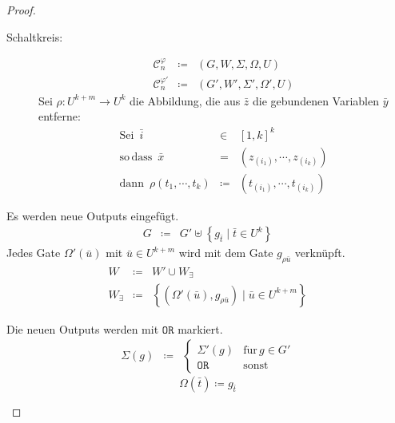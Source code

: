 \begin{proof}
\begin{casenv}
\begin{description}
\item [{Schaltkreis:}] 
\begin{eqnarray*}
\mathcal{C}_{n}^{\varphi} & \coloneqq & \left(G,W,\Sigma,\Omega,U\right)\\
\mathcal{C}_{n}^{\varphi'} & \coloneqq & \left(G',W',\Sigma',\Omega',U\right)
\end{eqnarray*}
Sei $\rho:U^{k+m}\rightarrow U^{k}$ die Abbildung, die aus $\bar{z}$
die gebundenen Variablen $\bar{y}$ entferne:
\begin{eqnarray*}
\mathrm{Sei}\,\,\,\bar{i} & \in & \left[1,k\right]^{k}\\
\mathrm{so}\,\mathrm{dass}\,\,\,\bar{x} & = & \left(z_{\left(i_{1}\right)},\cdots,z_{\left(i_{k}\right)}\right)\\
\mathrm{dann}\,\,\,\rho\left(t_{1},\cdots,t_{k}\right) & \coloneqq & \left(t_{\left(i_{1}\right)},\cdots,t_{\left(i_{k}\right)}\right)
\end{eqnarray*}
\end{description}
Es werden neue Outputs eingefügt.
\begin{eqnarray*}
G & \coloneqq & G'\uplus\left\{ g_{\bar{t}}\mid\bar{t}\in U^{k}\right\} 
\end{eqnarray*}
Jedes Gate $\Omega'\left(\bar{u}\right)$ mit $\bar{u}\in U^{k+m}$
wird mit dem Gate $g_{\rho\bar{u}}$ verknüpft.
\begin{eqnarray*}
W & \coloneqq & W'\cup W_{\exists}\\
W_{\exists} & \coloneqq & \left\{ \left(\Omega'\left(\bar{u}\right),g_{\rho\bar{u}}\right)\mid\bar{u}\in U^{k+m}\right\} 
\end{eqnarray*}

Die neuen Outputs werden mit $\mathtt{OR}$ markiert.
\begin{eqnarray*}
\Sigma\left(g\right) & \coloneqq & \begin{cases}
\Sigma'\left(g\right) & \mathrm{f\ddot{u}r}\,g\in G'\\
\mathtt{OR} & \mathrm{sonst}
\end{cases}
\end{eqnarray*}
\[
\Omega\left(\bar{t}\right)\coloneqq g_{\bar{t}}
\]


\end{casenv}
\end{proof}

